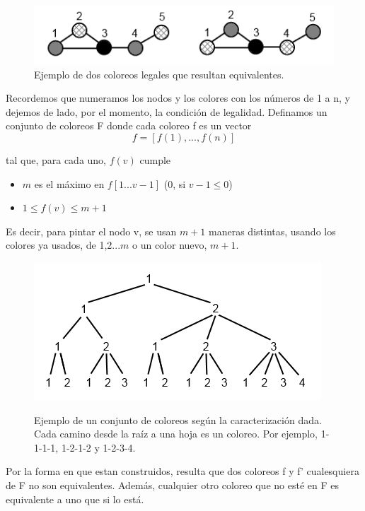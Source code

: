 \begin{figure}[H]
	\centering
	\includegraphics[scale=1]{ejemplo-mismos-coloreos.png}
\caption{Ejemplo de dos coloreos legales que resultan equivalentes.}
\label{fig:ejemploRepeticionColoreo}
\end{figure}


Recordemos que numeramos los nodos y los colores con los n\'umeros de 1 a n, y dejemos de lado, por el momento, la condici\'on de legalidad.
Definamos un conjunto de coloreos F donde cada coloreo f es un vector 
$$f = [f(1), ... , f(n)]$$


tal que, para cada uno, $f(v)$ cumple

\begin{itemize}
	\item $m$ es el m\'aximo en $f[1...v-1]$ (0, si $v-1 \leq 0$)
	\item $1 \leq f(v) \leq m+1$
\end{itemize}

Es decir, para pintar el nodo v, se usan $m+1$ maneras distintas, usando los colores ya usados, de 1,2...$m$ o un color nuevo, $m+1$.

\begin{figure}[H]
	\centering
	\includegraphics[scale=1]{ejemplo-coloreos-distintos.png}
\label{fig:ejemploColoreosDistintos}
\caption{Ejemplo de un conjunto de coloreos seg\'un la caracterizaci\'on dada. Cada camino desde la ra\'iz a una hoja es un coloreo. Por ejemplo, 1-1-1-1, 1-2-1-2 y 1-2-3-4.}
\end{figure}


Por la forma en que estan construidos, resulta que dos coloreos f y f' cualesquiera de F no son equivalentes. 
Adem\'as, cualquier otro coloreo que no est\'e en F es equivalente a uno que si lo est\'a.

